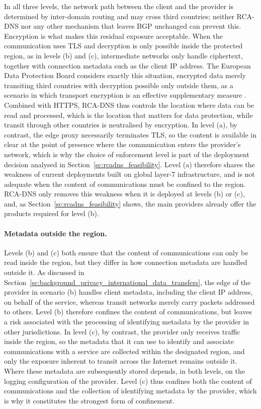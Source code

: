 In all three levels, the network path between the client and the provider is determined by inter-domain routing and may cross third countries; neither RCA-DNS nor any other mechanism that leaves BGP unchanged can prevent this. Encryption is what makes this residual exposure acceptable. When the communication uses TLS and decryption is only possible inside the protected region, as in levels (b) and (c), intermediate networks only handle ciphertext, together with connection metadata such as the client IP address. The European Data Protection Board considers exactly this situation, encrypted data merely transiting third countries with decryption possible only outside them, as a scenario in which transport encryption is an effective supplementary measure \cite{RecommendationsBoard}. Combined with HTTPS, RCA-DNS thus controls the location where data can be read and processed, which is the location that matters for data protection, while transit through other countries is neutralised by encryption. In level (a), by contrast, the edge proxy necessarily terminates TLS, so the content is available in clear at the point of presence where the communication enters the provider's network, which is why the choice of enforcement level is part of the deployment decision analysed in Section~\ref{sc:rcadns_feasibility}. Level (a) therefore shares the weakness of current deployments built on global layer-7 infrastructure, and is not adequate when the content of communications must be confined to the region. RCA-DNS only removes this weakness when it is deployed at levels (b) or (c), and, as Section~\ref{sc:rcadns_feasibility} shows, the main providers already offer the products required for level (b).

\paragraph{Metadata outside the region.} Levels (b) and (c) both ensure that the content of communications can only be read inside the region, but they differ in how connection metadata are handled outside it. As discussed in Section~\ref{sc:background_privacy_international_data_transfers}, the edge of the provider in scenario (b) handles client metadata, including the client IP address, on behalf of the service, whereas transit networks merely carry packets addressed to others. Level (b) therefore confines the content of communications, but leaves a risk associated with the processing of identifying metadata by the provider in other jurisdictions. In level (c), by contrast, the provider only receives traffic inside the region, so the metadata that it can use to identify and associate communications with a service are collected within the designated region, and only the exposure inherent to transit across the Internet remains outside it. Where these metadata are subsequently stored depends, in both levels, on the logging configuration of the provider. Level (c) thus confines both the content of communications and the collection of identifying metadata by the provider, which is why it constitutes the strongest form of confinement.


